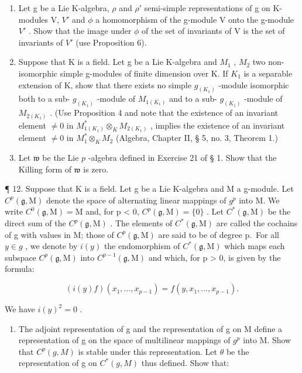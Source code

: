 \begin{enumerate}
\def\labelenumi{\arabic{enumi}.}
\setcounter{enumi}{8}
\item
  Let g be a Lie K-algebra, \(\rho\) and \(\rho'\) semi-simple representations of g on K-modules V, \(V'\) and \(\phi\) a homomorphism of the g-module V onto the g-module \(V'\) . Show that the image under \(\phi\) of the set of invariants of V is the set of invariants of \(V'\) (use Proposition 6).
\item
  Suppose that K is a field. Let g be a Lie K-algebra and \(M_{1}\) , \(M_{2}\) two non-isomorphic simple g-modules of finite dimension over K. If \(K_{1}\) is a separable extension of K, show that there exists no simple \(g_{(K_{1})}\) -module isomorphic both to a sub- \(g_{(K_{1})}\) -module of \(M_{1(K_{1})}\) and to a sub- \(g_{(K_{1})}\) -module of \(M_{2(K_{1})}\) . (Use Proposition 4 and note that the existence of an invariant element \(\neq0\) in \(M_{1(K_{1})}^{*}\otimes_{K}M_{2(K_{1})}\) , implies the existence of an invariant element \(\neq0\) in \(M_{1}^{*}\otimes_{K}M_{2}\) (Algebra, Chapter II, § 5, no. 3, Theorem 1.)
\item
  Let \(\mathfrak{w}\) be the Lie \(p\) -algebra defined in Exercise 21 of § 1. Show that the Killing form of \(\mathfrak{w}\) is zero.
\end{enumerate}

¶ 12. Suppose that K is a field. Let g be a Lie K-algebra and M a g-module. Let \(C^{p}(\mathfrak{g}, \mathrm{M})\) denote the space of alternating linear mappings of \(g^{p}\) into M. We write \(C^{0}(\mathfrak{g}, \mathrm{M}) = \mathrm{M}\) and, for p \textless{} 0, \(C^{p}(\mathfrak{g}, \mathrm{M}) = \{0\}\) . Let \(C^{*}(\mathfrak{g}, \mathrm{M})\) be the direct sum of the \(C^{p}(\mathfrak{g}, \mathrm{M})\) . The elements of \(C^{*}(\mathfrak{g}, \mathrm{M})\) are called the cochains of g with values in M; those of \(C^{p}(\mathfrak{g}, \mathrm{M})\) are said to be of degree p.~For all \(y \in g\) , we denote by \(i(y)\) the endomorphism of \(C^{*}(\mathfrak{g}, \mathrm{M})\) which maps each subspace \(C^{p}(\mathfrak{g}, \mathrm{M})\) into \(C^{p-1}(\mathfrak{g}, \mathrm{M})\) and which, for p \textgreater{} 0, is given by the formula:

\[
(i (y) f) \left(x _ {1}, \dots , x _ {p - 1}\right) = f \left(y, x _ {1}, \dots , x _ {p - 1}\right).\tag{1}
\]

We have \(i(y)^{2}=0\) .

\begin{enumerate}
\def\labelenumi{(\alph{enumi})}
\tightlist
\item
  The adjoint representation of g and the representation of g on M define a representation of g on the space of multilinear mappings of \(g^{p}\) into M. Show that \(C^{p}(g, M)\) is stable under this representation. Let \(\theta\) be the representation of g on \(C^{*}(g, M)\) thus defined. Show that:
\end{enumerate}

